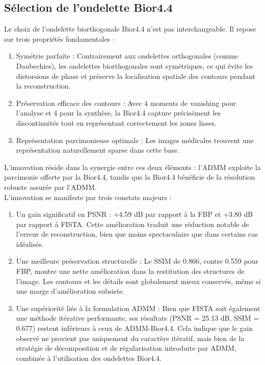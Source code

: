 \subsection{Sélection de l'ondelette Bior4.4}
Le choix de l'ondelette biorthogonale Bior4.4 n'est pas interchangeable. Il repose sur trois propriétés fondamentales :
\begin{enumerate}
    \item Symétrie parfaite : Contrairement aux ondelettes orthogonales (comme Daubechies), les ondelettes biorthogonales sont symétriques, ce qui évite les distorsions de phase et préserve la localisation spatiale des contours pendant la reconstruction.

    \item Préservation efficace des contours : Avec 4 moments de vanishing pour l'analyse et 4 pour la synthèse, la Bior4.4 capture précisément les discontinuités tout en représentant correctement les zones lisses.

    \item Représentation parcimonieuse optimale : Les images médicales trouvent une représentation naturellement sparse dans cette base.
\end{enumerate}
L'innovation réside dans la synergie entre ces deux éléments : l'ADMM exploite la parcimonie offerte par la Bior4.4, tandis que la Bior4.4 bénéficie de la résolution robuste assurée par l'ADMM.\\
L'innovation se manifeste par trois constats majeurs :
\begin{enumerate}
    \item Un gain significatif en PSNR : +4.59 dB par rapport à la FBP et +3.80 dB par rapport à FISTA. Cette amélioration traduit une réduction notable de l'erreur de reconstruction, bien que moins spectaculaire que dans certains cas idéalisés.

    \item Une meilleure préservation structurelle : Le SSIM de 0.866, contre 0.559 pour FBP, montre une nette amélioration dans la restitution des structures de l'image. Les contours et les détails sont globalement mieux conservés, même si une marge d'amélioration subsiste.

    \item Une supériorité liée à la formulation ADMM : Bien que FISTA soit également une méthode itérative performante, ses résultats (PSNR = 25.13 dB, SSIM = 0.677) restent inférieurs à ceux de ADMM-Bior4.4. Cela indique que le gain observé ne provient pas uniquement du caractère itératif, mais bien de la stratégie de décomposition et de régularisation introduite par ADMM, combinée à l'utilisation des ondelettes Bior4.4.
\end{enumerate}

